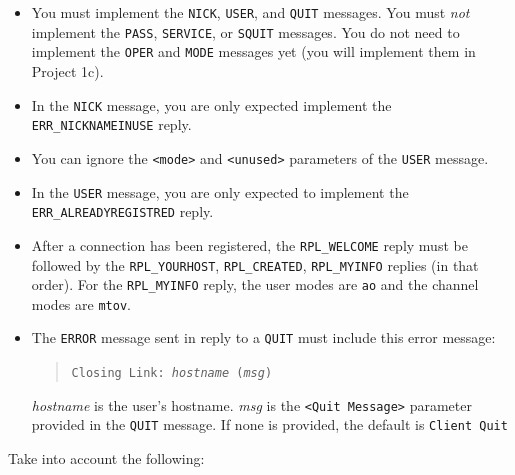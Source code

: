 \documentclass[10pt]{article}
\begin{document}
\begin{itemize}
\item You must implement the \texttt{NICK}, \texttt{USER}, and \texttt{QUIT} messages. You must \emph{not} implement the \texttt{PASS}, \texttt{SERVICE}, or \texttt{SQUIT} messages. You do not need to implement the \texttt{OPER} and \texttt{MODE} messages yet (you will implement them in Project 1c).
\item In the \texttt{NICK} message, you are only expected implement the \texttt{ERR\_NICKNAMEINUSE} reply.
\item You can ignore the \texttt{<mode>} and \texttt{<unused>} parameters of the \texttt{USER} message.
\item In the \texttt{USER} message, you are only expected to implement the \texttt{ERR\_ALREADYREGISTRED} reply.
\item After a connection has been registered, the \texttt{RPL\_WELCOME} reply must be followed by the \texttt{RPL\_YOURHOST}, \texttt{RPL\_CREATED}, \texttt{RPL\_MYINFO} replies (in that order). For the \texttt{RPL\_MYINFO} reply, the user modes are \texttt{ao} and the channel modes are \texttt{mtov}.
\item The \texttt{ERROR} message sent in reply to a \texttt{QUIT} must include this error message: 

\begin{quote}
\texttt{Closing Link: \textrm{\emph{hostname}} (\textrm{\emph{msg}})}
\end{quote}

\emph{hostname} is the user's hostname. \emph{msg} is the \texttt{<Quit Message>} parameter provided in the \texttt{QUIT} message. If none is provided, the default is \texttt{Client Quit}
\end{itemize}

\noindent Take into account the following:
\end{document}
